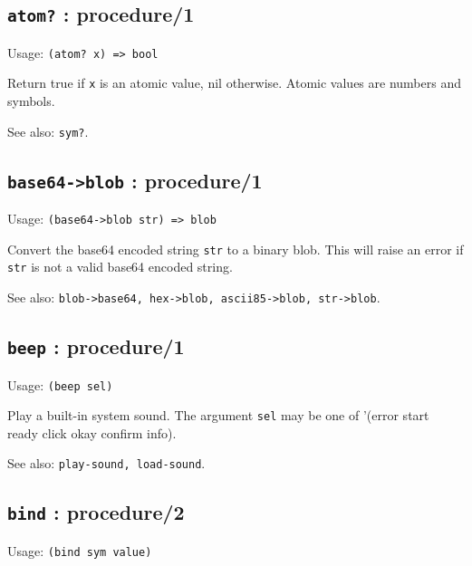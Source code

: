\documentclass[
]{article}
\newcommand{\passthrough}[1]{#1}
\begin{document}
\hypertarget{atom-procedure1-1}{%
\subsection{\texorpdfstring{\texttt{atom?} :
procedure/1}{atom? : procedure/1}}\label{atom-procedure1-1}}

Usage: \passthrough{\lstinline!(atom? x) => bool!}

Return true if \passthrough{\lstinline!x!} is an atomic value, nil
otherwise. Atomic values are numbers and symbols.

See also: \passthrough{\lstinline!sym?!}.

\hypertarget{base64-blob-procedure1-1}{%
\subsection{\texorpdfstring{\texttt{base64-\textgreater{}blob} :
procedure/1}{base64-\textgreater blob : procedure/1}}\label{base64-blob-procedure1-1}}

Usage: \passthrough{\lstinline!(base64->blob str) => blob!}

Convert the base64 encoded string \passthrough{\lstinline!str!} to a
binary blob. This will raise an error if \passthrough{\lstinline!str!}
is not a valid base64 encoded string.

See also:
\passthrough{\lstinline!blob->base64, hex->blob, ascii85->blob, str->blob!}.

\hypertarget{beep-procedure1-1}{%
\subsection{\texorpdfstring{\texttt{beep} :
procedure/1}{beep : procedure/1}}\label{beep-procedure1-1}}

Usage: \passthrough{\lstinline!(beep sel)!}

Play a built-in system sound. The argument \passthrough{\lstinline!sel!}
may be one of '(error start ready click okay confirm info).

See also: \passthrough{\lstinline!play-sound, load-sound!}.

\hypertarget{bind-procedure2-1}{%
\subsection{\texorpdfstring{\texttt{bind} :
procedure/2}{bind : procedure/2}}\label{bind-procedure2-1}}

Usage: \passthrough{\lstinline!(bind sym value)!}
\end{document}

